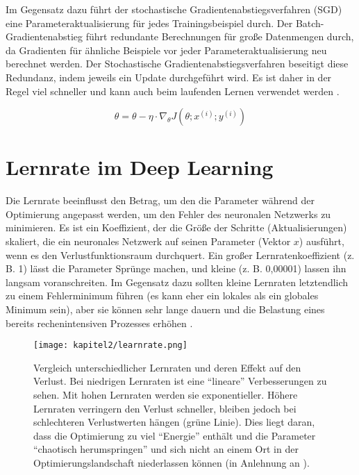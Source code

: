         Im Gegensatz dazu führt der stochastische Gradientenabstiegsverfahren (SGD) eine Parameteraktualisierung für jedes Trainingsbeispiel durch. Der Batch-Gradientenabstieg führt redundante Berechnungen für große Datenmengen durch, da Gradienten für ähnliche Beispiele vor jeder Parameteraktualisierung neu berechnet werden. Der Stochastische Gradientenabstiegsverfahren beseitigt diese Redundanz, indem jeweils ein Update durchgeführt wird. Es ist daher in der Regel viel schneller und kann auch beim laufenden Lernen verwendet werden \cite*{Ruder2016}.

        \begin{equation} \label{FormelGradStoch}
            \theta = \theta - \eta \cdot \nabla_{\theta}J(\theta;x^{(i)};y^{(i)})
        \end{equation}



        \section{Lernrate im Deep Learning}
        Die Lernrate beeinflusst den Betrag, um den die Parameter während der Optimierung angepasst werden, um den Fehler des neuronalen Netzwerks zu minimieren. Es ist ein Koeffizient, der die Größe der Schritte (Aktualisierungen) skaliert, die ein neuronales Netzwerk auf seinen Parameter (Vektor $x$) ausführt, wenn es den Verlustfunktionsraum durchquert. Ein großer Lernratenkoeffizient (z. B. 1) lässt die Parameter Sprünge machen, und kleine (z. B. 0,00001) lassen ihn langsam voranschreiten. Im Gegensatz dazu sollten kleine Lernraten letztendlich zu einem Fehlerminimum führen (es kann eher ein lokales als ein globales Minimum sein), aber sie können sehr lange dauern und die Belastung eines bereits rechenintensiven Prozesses erhöhen  \cite*[77]{Patterson2019}.


        \begin{figure}[H]
            \centering
            \texttt{[image: kapitel2/learnrate.png]}
            \caption[Einfluss der Lernrate auf den Verlust]{Vergleich unterschiedlicher Lernraten und deren Effekt auf den Verlust. Bei niedrigen Lernraten ist eine \enquote{lineare} Verbesserungen zu sehen. Mit hohen Lernraten werden sie exponentieller. Höhere Lernraten verringern den Verlust schneller, bleiben jedoch bei schlechteren Verlustwerten hängen (grüne Linie). Dies liegt daran, dass die Optimierung zu viel \enquote{Energie} enthält und die Parameter \enquote{chaotisch herumspringen} und sich nicht an einem Ort in der Optimierungslandschaft niederlassen können (in Anlehnung an \cite*{StanfordUniversityCoursecs231n2018}). }
            \label{Kap2:Lern}
        \end{figure}

